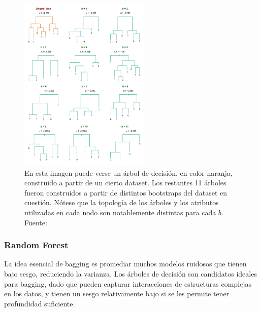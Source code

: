 \begin{figure}[h!]
\begin{center}
  \includegraphics[width=0.56\textwidth]{Kap1/bootstrap_trees.png} 
\end{center}
\caption{ En esta imagen puede verse un árbol de decisión, en color naranja, construido a partir de un cierto dataset. Los restantes 11 árboles fueron construidos a partir de distintos bootstraps del dataset en cuestión. Nótese que la topología de los árboles y los atributos utilizadas en cada nodo son notablemente distintas para cada $b$. Fuente: \protect\cite{statisticallearning} }
\label{fig:bootstrap_trees}
\end{figure}


\subsubsection{Random Forest}

La idea esencial de bagging es promediar muchos modelos ruidosos que tienen bajo sesgo, reduciendo la varianza. Los árboles de decisión son candidatos ideales para bagging, dado que pueden capturar interacciones de estructuras complejas en los datos, y tienen un sesgo relativamente bajo si se les permite tener profundidad suficiente. 

